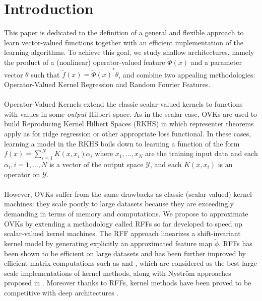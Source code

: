 \documentclass[twoside,11pt]{article}
\begin{document}
\section{Introduction}
This paper is dedicated to the definition of a general and flexible approach to
learn vector-valued functions together with an efficient implementation of the
learning algorithms. To achieve this goal, we study shallow architectures,
namely the product of a (nonlinear) operator-valued feature
$\widetilde{\Phi}(x)$ and a parameter vector $\theta$ such that
$\widetilde{f}(x) = {\widetilde{\Phi}(x)}^* \theta$, and combine two appealing
methodologies: Operator-Valued Kernel Regression and Random Fourier Features.
\paragraph{}
Operator-Valued Kernels \citep{Micchelli2005,Carmeli2010,Kadri_aistat10,
Brouard2011,Alvarez2012} extend the classic scalar-valued kernels to functions
with values in some \emph{output} Hilbert space. As in the scalar case,
\acfp{OVK} are used to build Reproducing Kernel Hilbert Spaces (\acs{RKHS}) in
which representer theorems apply as for ridge regression or other appropriate
loss functional. In these cases, learning a model in the \acs{RKHS} boils down
to learning a function of the form $f(x)=\sum_{i=1}^N K(x,x_i)\alpha_i$ where
$x_1, \ldots, x_N$ are the training input data and each $\alpha_i, i=1, \ldots,
N$ is a vector of the output space $\mathcal{Y}$, and each $K(x,x_i)$ is an
operator on $\mathcal{Y}$.
\paragraph{}
However, \acsp{OVK} suffer from the same drawbacks as classic
(sca\-lar-va\-lued) kernel machines: they scale poorly to large datasets
because they are exceedingly demanding in terms of memory and computations. We
propose to approximate OVKs by extending a methodology called \acfp{RFF}
\citep{Rahimi2007, Le2013, Yang2015, sriper2015, Bach2015, sutherland2015,
rudi2016generalization} so far developed to speed up scalar-valued kernel
machines. The \acs{RFF} approach linearizes a shift-invariant kernel model by
generating explicitly an approximated feature map $\tilde{\phi}$. \acsp{RFF}
has been shown to be efficient on large datasets \citep{rudi2016generalization}
and has been further improved by efficient matrix computations such as
\citep[``FastFood'']{Le2013} and \citep[``SORF'']{felix2016orthogonal}, which
are considered as the best large scale implementations of kernel methods, along
with Nystr\"om approaches proposed in \citet{drineas2005nystrom}. Moreover
thanks to \acsp{RFF}, kernel methods have been proved to be competitive with
deep architectures \citep{lu2014scale, dai2014scalable, yang2015deep}.
\end{document}
